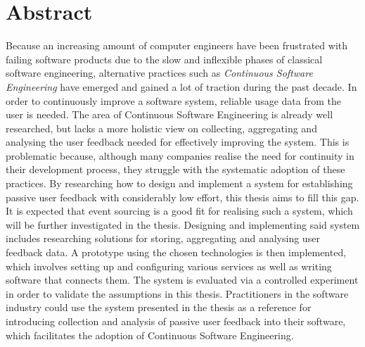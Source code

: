 %
\chapter*{Abstract}
\label{sec:abstract}
\vspace*{-10mm}

Because an increasing amount of computer engineers have been frustrated with failing software products due to the slow and inflexible phases of classical software engineering, alternative practices such as \emph{Continuous Software Engineering} have emerged and gained a lot of traction during the past decade.
In order to continuously improve a software system, reliable usage data from the user is needed.
The area of Continuous Software Engineering is already well researched, but lacks a more holistic view on collecting, aggregating and analysing the user feedback needed for effectively improving the system.
This is problematic because, although many companies realise the need for continuity in their development process, they struggle with the systematic adoption of these practices.
By researching how to design and implement a system for establishing passive user feedback with considerably low effort, this thesis aims to fill this gap.
It is expected that event sourcing is a good fit for realising such a system, which will be further investigated in the thesis.
Designing and implementing said system includes researching solutions for storing, aggregating and analysing user feedback data.
A prototype using the chosen technologies is then implemented, which involves setting up and configuring various services as well as writing software that connects them.
The system is evaluated via a controlled experiment in order to validate the assumptions in this thesis.
Practitioners in the software industry could use the system presented in the thesis as a reference for introducing collection and analysis of passive user feedback into their software, which facilitates the adoption of Continuous Software Engineering.
